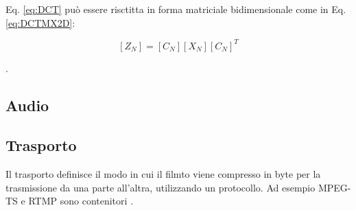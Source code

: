 Eq. \ref{eq:DCT} può essere risctitta in forma matriciale bidimensionale come in Eq. \ref{eq:DCTMX2D}:

\begin{equation} \label{eq:DCTMX2D}
	[Z_N] = [C_N][X_N][C_N]^T
\end{equation}

\parencite{HyesookLim2000Asaf}.

\subsection{Audio}

\subsection{Trasporto}
Il trasporto definisce il modo in cui il filmto viene compresso in byte per la trasmissione da una parte all'altra, utilizzando un protocollo. Ad esempio MPEG-TS e RTMP sono contenitori \parencite{CombinedICTTechnologies}.


